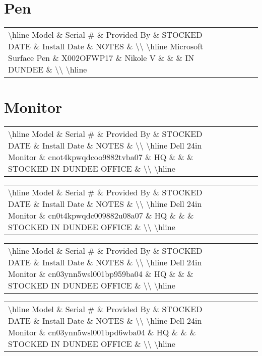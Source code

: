 \documentclass{article}%
\begin{document}
%
\section{Pen}%
\label{sec:Pen}%
\begin{tabularx}{\textwidth}{|X|X|X|X|X|X|X|}%
\textbackslash{}hline%
Model \& Serial \# \& Provided By \& STOCKED DATE \& Install Date \& NOTES \&  \textbackslash{}\textbackslash{}%
\textbackslash{}hline%
Microsoft Surface Pen \& X002OFWP17 \& Nikole V \&  \&  \& IN DUNDEE \&  \textbackslash{}\textbackslash{}%
\textbackslash{}hline%
\end{tabularx}

%
\section{Monitor}%
\label{sec:Monitor}%
\begin{tabularx}{\textwidth}{|X|X|X|X|X|X|X|}%
\textbackslash{}hline%
Model \& Serial \# \& Provided By \& STOCKED DATE \& Install Date \& NOTES \&  \textbackslash{}\textbackslash{}%
\textbackslash{}hline%
Dell 24in Monitor \& cnot4kpwqdcoo9882tvba07 \& HQ \&  \&  \& STOCKED IN DUNDEE OFFICE \&  \textbackslash{}\textbackslash{}%
\textbackslash{}hline%
\end{tabularx}%
\begin{tabularx}{\textwidth}{|X|X|X|X|X|X|X|}%
\textbackslash{}hline%
Model \& Serial \# \& Provided By \& STOCKED DATE \& Install Date \& NOTES \&  \textbackslash{}\textbackslash{}%
\textbackslash{}hline%
Dell 24in Monitor \& cn0t4kpwqdc009882u08a07 \& HQ \&  \&  \& STOCKED IN DUNDEE OFFICE \&  \textbackslash{}\textbackslash{}%
\textbackslash{}hline%
\end{tabularx}%
\begin{tabularx}{\textwidth}{|X|X|X|X|X|X|X|}%
\textbackslash{}hline%
Model \& Serial \# \& Provided By \& STOCKED DATE \& Install Date \& NOTES \&  \textbackslash{}\textbackslash{}%
\textbackslash{}hline%
Dell 24in Monitor \& cn03ynn5wsl001bp959ba04 \& HQ \&  \&  \& STOCKED IN DUNDEE OFFICE \&  \textbackslash{}\textbackslash{}%
\textbackslash{}hline%
\end{tabularx}%
\begin{tabularx}{\textwidth}{|X|X|X|X|X|X|X|}%
\textbackslash{}hline%
Model \& Serial \# \& Provided By \& STOCKED DATE \& Install Date \& NOTES \&  \textbackslash{}\textbackslash{}%
\textbackslash{}hline%
Dell 24in Monitor \& cn03ynn5wsl001bpd6wba04 \& HQ \&  \&  \& STOCKED IN DUNDEE OFFICE \&  \textbackslash{}\textbackslash{}%
\textbackslash{}hline%
\end{tabularx}%
\end{document}
